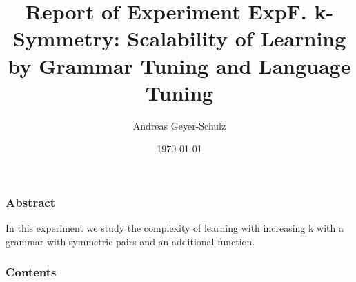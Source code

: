 \documentclass[18pt,c]{beamer}
\begin{document}
\title{Report of Experiment ExpF. k-Symmetry: Scalability of Learning by Grammar Tuning and Language Tuning  }
\author{Andreas Geyer-Schulz}
\date{\today}
\begin{frame}
\titlepage
\end{frame}
\begin{frame}
\frametitle{Abstract}
In this experiment we study the complexity of learning  with increasing k with a grammar with symmetric pairs and an additional function.%
\end{frame}
\begin{frame}[t, allowframebreaks]
\frametitle{Contents}
\tableofcontents[subsubsectionstyle=hide]
\vfill
\end{frame}
\end{document}
